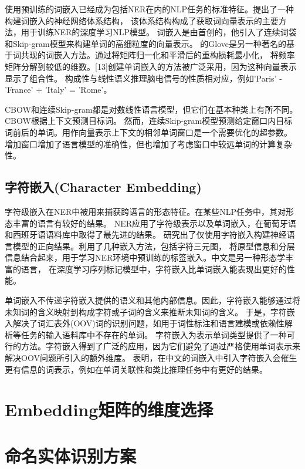 使用预训练的词嵌入已经成为包括NER在内的NLP任务的标准特征。\parencite{collobert2011natural}提出了一种构建词嵌入的神经网络体系结构，
该体系结构构成了获取词向量表示的主要方法，用于训练NER的深度学习NLP模型。
词嵌入是由\parencite{mikolov2013efficient}首创的，他引入了连续词袋和Skip-gram模型来构建单词的高细粒度的向量表示。
\parencite{pennington2014glove}的Glove是另一种著名的基于词共现的词嵌入方法。通过将矩阵归一化和平滑后的重构损耗最小化，
将频率矩阵分解到较低的维数。[13]创建单词嵌入的方法被广泛采用，因为这种向量表示显示了组合性。
构成性与线性语义推理脑电信号的性质相对应，例如'Paris' - 'France' + 'Italy' = 'Rome'。

CBOW和连续Skip-gram都是对数线性语言模型，但它们在基本种类上有所不同。CBOW根据上下文预测目标词。
然而，连续Skip-gram模型预测给定窗口内目标词前后的单词。用作向量表示上下文的相邻单词窗口是一个需要优化的超参数。
增加窗口增加了语言模型的准确性，但也增加了考虑窗口中较远单词的计算复杂性。



\subsection{字符嵌入(Character Embedding)}

字符级嵌入在NER中被用来捕获跨语言的形态特征。在某些NLP任务中，其对形态丰富的语言有较好的结果。
\parencite{santos2015boosting}NER应用了字符级表示以及单词嵌入，在葡萄牙语和西班牙语语料库中取得了最先进的结果。
\parencite{kim2016character}研究出了仅使用字符嵌入构建神经语言模型的正向结果。\parencite{ma2016end}利用了几种嵌入方法，包括字符三元图，
将原型信息和分层信息结合起来，用于学习NER环境中预训练的标签嵌入。中文是另一种形态学丰富的语言，
在深度学习序列标记模型中，字符嵌入比单词嵌入能表现出更好的性能\parencite{zheng2013deep}。

单词嵌入不传递字符嵌入提供的语义和其他内部信息。因此，字符嵌入能够通过将未知词的含义映射到构成字符或子词的含义来推断未知词的含义。
于是，字符嵌入解决了词汇表外(OOV)词的识别问题，如用于词性标注和语言建模或依赖性解析\parencite{ballesteros2015improved}等任务的输入语料库中不存在的单词。
字符嵌入为表示单词类型提供了一种可行的方法。字符嵌入得到了广泛的应用，因为它们避免了通过严格使用单词表示来解决OOV问题所引入的额外维度。
\parencite{chen2015joint}表明，在中文的词嵌入中引入字符嵌入会催生更有信息的词表示，例如在单词关联性和类比推理任务中有更好的结果。


\section{Embedding矩阵的维度选择}


\section{命名实体识别方案}

